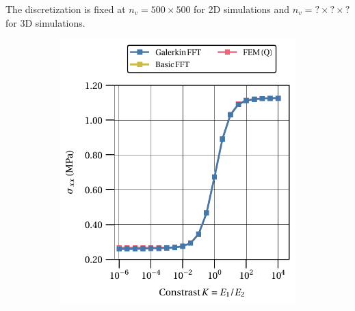The discretization is fixed at \(n_v=500\times 500\) for 2D simulations and \(n_v=?\times?\times?\) for 3D simulations.

\begin{figure}[hbt]
\centering
	\begin{subfigure}[b]{0.49\textwidth}
    \centering
    \includegraphics[width=\textwidth]{figures/linear_2D_normal_stress_avg_vs_stiff_ratio}
    \caption{}
    \label{subfig:linear_2D_normal_stress_avg_vs_stiff_ratio}
  \end{subfigure}
  \begin{subfigure}[b]{0.49\textwidth}
    \centering

\end{subfigure}
\end{figure}
